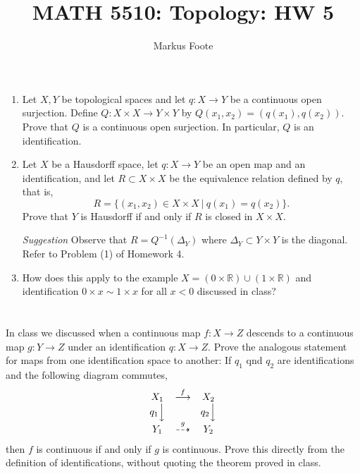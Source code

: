 \documentclass{jhwhw}
\title{MATH 5510: Topology: HW 5}
\author{Markus Foote}
\newcommand{\R}{{\mathbb R}}
\begin{document}
\problem{}%
\begin{enumerate}
	
	\item Let $X,Y$ be topological spaces and let $q:X\to Y$ be a continuous open surjection. Define 
	$Q:X\times X \to Y\times Y$ by  $Q(x_1,x_2) = (q(x_1),q(x_2)).$  
	Prove that $Q$ is a continuous open surjection.  In particular, $Q$ is an identification.
	\item Let $X$ be a Hausdorff space, let $q:X\to Y$ be an open map and an identification, and let $R\subset X\times X$ be the equivalence relation defined by $q$, that is,
	$$
	R = \{ (x_1,x_2)\in X\times X \ | \ q(x_1) = q(x_2) \}.
	$$
	Prove that $Y$ is Hausdorff if and only if $R$  is closed in $X\times X$. 
	
	\noindent\emph{Suggestion} Observe that  $R = Q^{-1}(\Delta_Y)$ where $\Delta_Y\subset Y\times Y$ is the diagonal.  Refer to Problem (1) of Homework 4.
	
	\item How does this apply to the example $X =( 0\times\R )\cup (1\times \R)$ and identification $0\times x \sim 1\times x$ for all $x<0$ discussed in class?
\end{enumerate}
\solution{}
\part{}%


\part{}%


\part{}%


\problem{} %
In class we discussed when a continuous map $f:X\to Z$ descends to a continuous map $g:Y\to Z$ under an identification $q:X\to Z$.  Prove the analogous statement for maps from one identification space to another: If $q_1$ qnd $q_2$ are identifications and the following diagram commutes,
\begin{eqnarray*}
	\begin{array}{ccc}
		X_1 & \buildrel f \over\longrightarrow & X_2 \\
		{q_1}\Big\downarrow &  & {q_2}\Big\downarrow\\
		Y_1 & \buildrel g \over\dashrightarrow & Y_2
	\end{array}
\end{eqnarray*}
then $f$ is continuous if and only if $g$ is continuous.   Prove this directly from the definition of identifications, without quoting the theorem proved in class.
\solution{}
\end{document}
